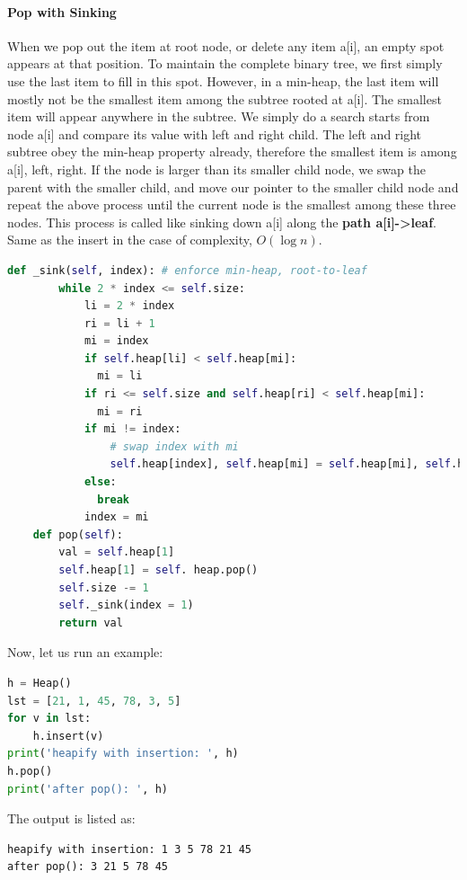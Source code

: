 \documentclass[main.tex]{subfiles}
\begin{document}
\paragraph{Pop with Sinking} When we pop out the item at root node,  or delete any item a[i], an empty spot appears at that position. To maintain the complete binary tree, we first  simply use the last item to fill in this spot. However, in a min-heap, the last item will mostly not be the smallest item among the subtree rooted at a[i]. The smallest item will appear anywhere in the subtree. We simply do a search starts from node a[i] and compare its value with left and right child. The left and right subtree obey the min-heap property already, therefore the smallest item is among a[i], left, right. If the node is larger than its smaller child node, we swap the parent with the smaller child, and move our pointer to the smaller child node and repeat the above process until the current node is the smallest among these three nodes.   This process is called like sinking down a[i] along the \textbf{path a[i]->leaf}. Same as the insert in the case of complexity, $O(\log n)$. 
\begin{lstlisting}[language=Python]
    def _sink(self, index): # enforce min-heap, root-to-leaf
        while 2 * index <= self.size:
            li = 2 * index
            ri = li + 1
            mi = index
            if self.heap[li] < self.heap[mi]:
              mi = li
            if ri <= self.size and self.heap[ri] < self.heap[mi]:
              mi = ri
            if mi != index:
                # swap index with mi
                self.heap[index], self.heap[mi] = self.heap[mi], self.heap[index]
            else:
              break
            index = mi
    def pop(self):
        val = self.heap[1]
        self.heap[1] = self. heap.pop()
        self.size -= 1
        self._sink(index = 1)
        return val
\end{lstlisting}
Now, let us run an example:
\begin{lstlisting}[language=Python]
h = Heap()
lst = [21, 1, 45, 78, 3, 5]
for v in lst:
    h.insert(v)
print('heapify with insertion: ', h)
h.pop()
print('after pop(): ', h)
\end{lstlisting}
The output is listed as:
\begin{lstlisting}
heapify with insertion: 1 3 5 78 21 45 
after pop(): 3 21 5 78 45 
\end{lstlisting}
\end{document}
